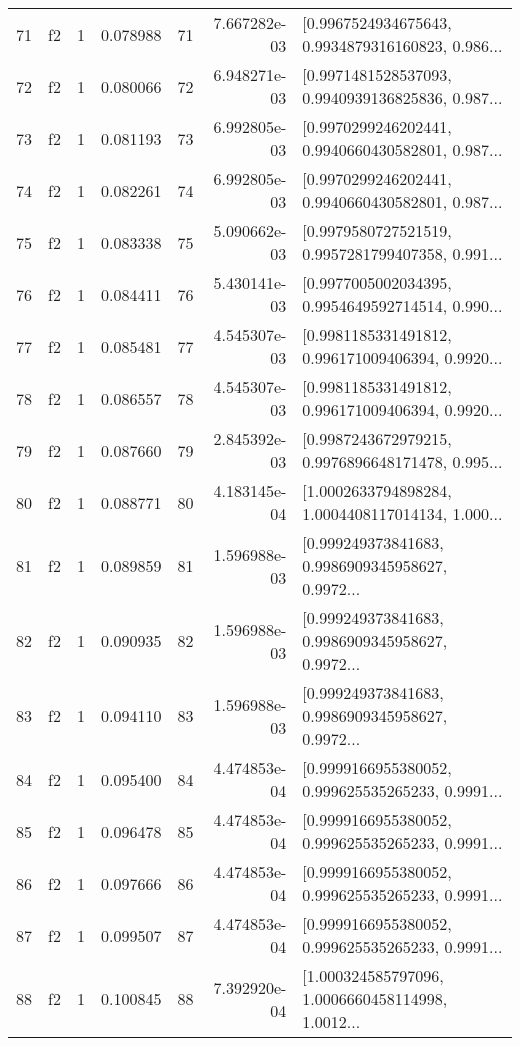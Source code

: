 \begin{tabular}{lllrlrl}
71  &  f2 &   1 &  0.078988 &   71 &  7.667282e-03 &  [0.9967524934675643, 0.9934879316160823, 0.986... \\
72  &  f2 &   1 &  0.080066 &   72 &  6.948271e-03 &  [0.9971481528537093, 0.9940939136825836, 0.987... \\
73  &  f2 &   1 &  0.081193 &   73 &  6.992805e-03 &  [0.9970299246202441, 0.9940660430582801, 0.987... \\
74  &  f2 &   1 &  0.082261 &   74 &  6.992805e-03 &  [0.9970299246202441, 0.9940660430582801, 0.987... \\
75  &  f2 &   1 &  0.083338 &   75 &  5.090662e-03 &  [0.9979580727521519, 0.9957281799407358, 0.991... \\
76  &  f2 &   1 &  0.084411 &   76 &  5.430141e-03 &  [0.9977005002034395, 0.9954649592714514, 0.990... \\
77  &  f2 &   1 &  0.085481 &   77 &  4.545307e-03 &  [0.9981185331491812, 0.996171009406394, 0.9920... \\
78  &  f2 &   1 &  0.086557 &   78 &  4.545307e-03 &  [0.9981185331491812, 0.996171009406394, 0.9920... \\
79  &  f2 &   1 &  0.087660 &   79 &  2.845392e-03 &  [0.9987243672979215, 0.9976896648171478, 0.995... \\
80  &  f2 &   1 &  0.088771 &   80 &  4.183145e-04 &  [1.0002633794898284, 1.0004408117014134, 1.000... \\
81  &  f2 &   1 &  0.089859 &   81 &  1.596988e-03 &  [0.999249373841683, 0.9986909345958627, 0.9972... \\
82  &  f2 &   1 &  0.090935 &   82 &  1.596988e-03 &  [0.999249373841683, 0.9986909345958627, 0.9972... \\
83  &  f2 &   1 &  0.094110 &   83 &  1.596988e-03 &  [0.999249373841683, 0.9986909345958627, 0.9972... \\
84  &  f2 &   1 &  0.095400 &   84 &  4.474853e-04 &  [0.9999166955380052, 0.999625535265233, 0.9991... \\
85  &  f2 &   1 &  0.096478 &   85 &  4.474853e-04 &  [0.9999166955380052, 0.999625535265233, 0.9991... \\
86  &  f2 &   1 &  0.097666 &   86 &  4.474853e-04 &  [0.9999166955380052, 0.999625535265233, 0.9991... \\
87  &  f2 &   1 &  0.099507 &   87 &  4.474853e-04 &  [0.9999166955380052, 0.999625535265233, 0.9991... \\
88  &  f2 &   1 &  0.100845 &   88 &  7.392920e-04 &  [1.000324585797096, 1.0006660458114998, 1.0012... \\

\end{tabular}

